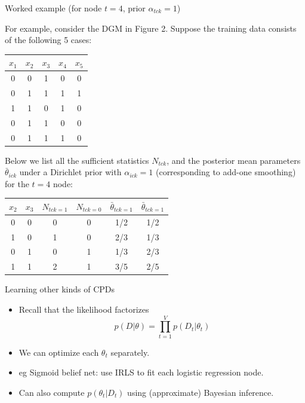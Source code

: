 \documentclass[10pt,mathserif]{beamer}
\begin{document}
\begin{frame}{Worked example (for node $t = 4$, prior $\alpha_{tck} = 1$)}

For example, consider the DGM in Figure 2. Suppose the training data consists of the following 5 cases:

\begin{table}[h!]
    \centering
    \begin{tabular}{c c c c c }
        $x_1$ & $x_2$ & $x_3$ & $x_4$ & $x_5$ \\
    \hline
        0 & 0 & 1 & 0 & 0\\
        0 & 1 & 1 & 1 & 1\\
        1 & 1 & 0 & 1 & 0\\
        0 & 1 & 1 & 0 & 0\\
        0 & 1 & 1 & 1 & 0
    \end{tabular}
    \label{tab:my_label}
\end{table}

Below we list all the sufficient statistics $N_{tck}$, and the posterior mean parameters $\bar{\theta}_{ick}$ under a Dirichlet prior with $\alpha_{ick} = 1$ (corresponding to add-one smoothing) for the $t = 4$ node:

\begin{table}[h!]
    \centering
    \begin{tabular}{ c c | c c | c c}
        $x_2$ & $x_3$ & $N_{tck=1}$ & $N_{tck=0}$ & $\bar{\theta}_{tck=1}$ & $\bar{\theta}_{tck=1}$\\
    \hline
        0 & 0 & 0 & 0 & 1/2 & 1/2\\
        1 & 0 & 1 & 0 & 2/3 & 1/3\\
        0 & 1 & 0 & 1 & 1/3 & 2/3\\
        1 & 1 & 2 & 1 & 3/5  & 2/5
    \end{tabular}
    \label{tab:my_label}
\end{table}
\end{frame}

\begin{frame}{Learning other kinds of CPDs}
\begin{itemize}
    \item Recall that the likelihood factorizes
    \begin{equation}
        p(D|\theta) = \prod_{t=1}^V p(D_t|\theta_t )
    \end{equation}
    
    \item We can optimize each $\theta_t$ separately.
    \item eg Sigmoid belief net: use IRLS to fit each logistic regression node.
    \item Can also compute $p(\theta_t|D_t)$ using (approximate) Bayesian inference.
\end{itemize}
\end{frame}
\end{document}
